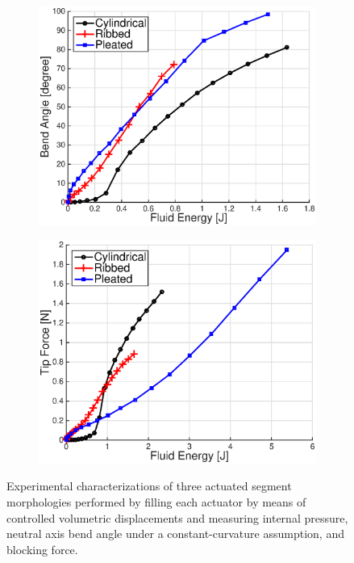 \begin{figure}[htb]
\begin{subfigure}[b]{0.95\columnwidth}
            \caption{}
            \label{fig:Characterization_CurvatureVsVolume}
        \end{subfigure} \\
        \begin{subfigure}[b]{0.95\columnwidth}
            \centering
            \includegraphics[width=0.95\columnwidth]{figures/actuators/morphologiescharacterization/BendAngleVsEnergyColor.eps}
            \caption{}
            \label{fig:Characterization_CurvatureVsEnergy}
        \end{subfigure}
        \begin{subfigure}[b]{0.95\columnwidth}
            \centering
            \includegraphics[width=0.95\columnwidth]{figures/actuators/morphologiescharacterization/ForceVsEnergyColor.eps}
            \caption{}
            \label{fig:Characterization_ForceVsEnergy}
        \end{subfigure}
        \caption[Experimental characterizations of three actuated segment morphologies.]{Experimental characterizations of three actuated segment morphologies performed by filling each actuator by means of controlled volumetric displacements and measuring internal pressure, neutral axis bend angle under a constant-curvature assumption, and blocking force.}\label{fig:actuator_characterization}
\end{figure}

